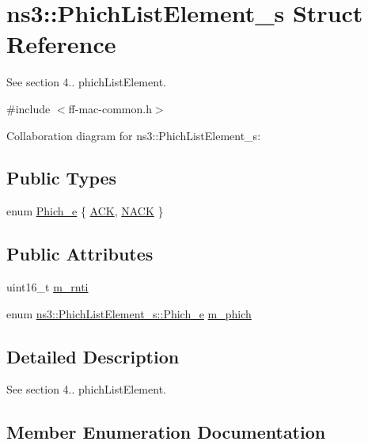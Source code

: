\hypertarget{structns3_1_1PhichListElement__s}{}\section{ns3\+:\+:Phich\+List\+Element\+\_\+s Struct Reference}
\label{structns3_1_1PhichListElement__s}


See section 4.. phich\+List\+Element.  




{\ttfamily \#include $<$ff-\/mac-\/common.\+h$>$}



Collaboration diagram for ns3\+:\+:Phich\+List\+Element\+\_\+s\+:
\subsection*{Public Types}
\begin{DoxyCompactItemize}
\item 
enum \hyperlink{structns3_1_1PhichListElement__s_a3d0578d58b70bd717fc65546989d00db}{Phich\+\_\+e} \{ \hyperlink{structns3_1_1PhichListElement__s_a3d0578d58b70bd717fc65546989d00dba247e452bf0d74d07f603525d048115a7}{A\+CK}, 
\hyperlink{structns3_1_1PhichListElement__s_a3d0578d58b70bd717fc65546989d00dba06bdaa56f3e3d157ad5e8234c49584c7}{N\+A\+CK}
 \}
\end{DoxyCompactItemize}
\subsection*{Public Attributes}
\begin{DoxyCompactItemize}
\item 
uint16\+\_\+t \hyperlink{structns3_1_1PhichListElement__s_ad53f9fa2e8546edeb2380caead9e0eb1}{m\+\_\+rnti}
\item 
enum \hyperlink{structns3_1_1PhichListElement__s_a3d0578d58b70bd717fc65546989d00db}{ns3\+::\+Phich\+List\+Element\+\_\+s\+::\+Phich\+\_\+e} \hyperlink{structns3_1_1PhichListElement__s_a8e55fd474803271637768959a514efaa}{m\+\_\+phich}
\end{DoxyCompactItemize}


\subsection{Detailed Description}
See section 4.. phich\+List\+Element. 

\subsection{Member Enumeration Documentation}
